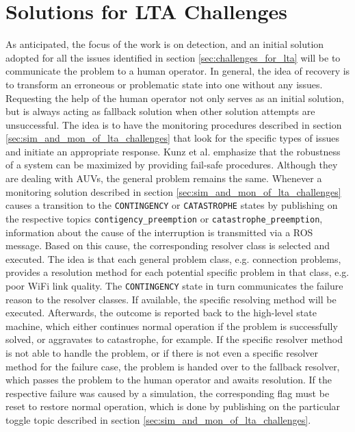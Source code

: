 \documentclass[english, master, utf8]{base/thesis_KBS}
\newcommand{\code}[1]{\colorbox{light-gray}{\texttt{#1}}}
\begin{document}
\section{Solutions for LTA Challenges}
\label{sec:solutions_for_lta_challenges}

As anticipated, the focus of the work is on detection, and an initial solution adopted for all the issues identified in section \ref{sec:challenges_for_lta} will be 
to communicate the problem to a human operator. In general, the idea of recovery is to transform an erroneous or problematic state into one without any issues. \cite{Brodskiy:2011}
Requesting the help of the human operator not only serves as an initial solution, but is always acting as fallback
solution when other solution attempts are unsuccessful. The idea is to have the monitoring procedures described in section \ref{sec:sim_and_mon_of_lta_challenges} that 
look for the specific types of issues and initiate an appropriate response. Kunz et al. \cite{Kunz:2009} emphasize that the robustness of a system can be maximized by
providing fail-safe procedures. Although they are dealing with AUVs, the general problem remains the same.\newline
Whenever a monitoring solution described in section \ref{sec:sim_and_mon_of_lta_challenges} causes a transition to the \code{CONTINGENCY} or \code{CATASTROPHE} states
by publishing on the respective topics \code{contigency\_preemption} or \code{catastrophe\_preemption}, information about the cause of the interruption is
transmitted via a ROS message. Based on this cause, the corresponding resolver class is selected and executed. The idea is that each general problem class, e.g.
connection problems, provides a resolution method for each potential specific problem in that class, e.g. poor WiFi link quality. The \code{CONTINGENCY} state in turn
communicates the failure reason to the resolver classes. If available, the specific resolving method will be executed. Afterwards, the outcome is reported back to the
high-level state machine, which either continues normal operation if the problem is successfully solved, or aggravates to catastrophe, for example. If the specific resolver
method is not able to handle the problem, or if there is not even a specific resolver method for the failure case, the problem is handed over to the fallback resolver,
which passes the problem to the human operator and awaits resolution. If the respective failure was caused by a simulation, the corresponding flag must be reset to restore
normal operation, which is done by publishing on the particular toggle topic described in section \ref{sec:sim_and_mon_of_lta_challenges}.
\end{document}
